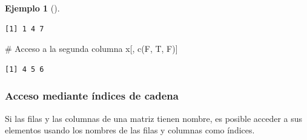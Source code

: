 \documentclass[
  a4paper,
]{scrreport}
\newenvironment{Shaded}{\begin{snugshade}}{\end{snugshade}}
\newcommand{\CommentTok}[1]{\textcolor[rgb]{0.37,0.37,0.37}{#1}}
\newcommand{\FunctionTok}[1]{\textcolor[rgb]{0.28,0.35,0.67}{#1}}
\newcommand{\NormalTok}[1]{\textcolor[rgb]{0.00,0.23,0.31}{#1}}
\theoremstyle{definition}
\theoremstyle{definition}
\newtheorem{example}{Ejemplo}[chapter]
\theoremstyle{remark}
\begin{document}
\begin{example}[]
\begin{verbatim}
[1] 1 4 7
\end{verbatim}

\begin{Shaded}
\begin{Highlighting}[]
\CommentTok{\# Acceso a la segunda columna}
\NormalTok{x[, }\FunctionTok{c}\NormalTok{(F, T, F)]}
\end{Highlighting}
\end{Shaded}

\begin{verbatim}
[1] 4 5 6
\end{verbatim}

\end{example}

\hypertarget{acceso-mediante-uxedndices-de-cadena}{%
\subsubsection{Acceso mediante índices de
cadena}\label{acceso-mediante-uxedndices-de-cadena}}

Si las filas y las columnas de una matriz tienen nombre, es posible
acceder a sus elementos usando los nombres de las filas y columnas como
índices.
\end{document}
